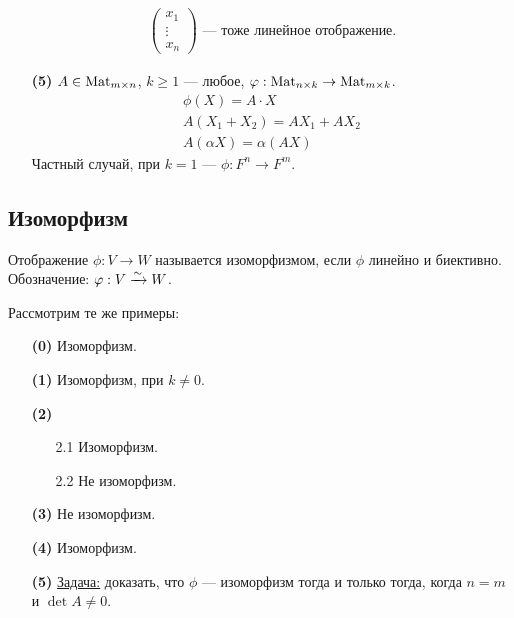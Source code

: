 \begin{itemize}
\begin{gather*}
\begin{pmatrix*}
x_1 \\
\vdots \\
x_n
\end{pmatrix*} \text{ --- тоже линейное отображение.}
\end{gather*}
\item[\textbf{(5)}] $A \in \mathrm{Mat}_{m\times n}$, $k \geqslant 1$ --- любое, $\varphi: \mathrm{Mat}_{n\times k} \rightarrow \mathrm{Mat}_{m\times k}$.
\begin{gather*}
\phi(X) = A \cdot X \\
A(X_1 + X_2) = AX_1 + AX_2 \\
A(\alpha X) = \alpha(AX) 
\end{gather*}
Частный случай, при $k = 1$ --- $\phi: F^n \rightarrow F^m$.
\end{itemize}

\subsection{Изоморфизм}
\begin{Def}
Отображение $\phi: V \rightarrow W$ называется изоморфизмом, если $\phi$ линейно и биективно. Обозначение: $\varphi : V \xrightarrow{\sim}  W$.
\end{Def}
\vspace{0.3cm}
Рассмотрим те же примеры:
\begin{itemize}
\item[\textbf{(0)}] Изоморфизм.
\item[\textbf{(1)}] Изоморфизм, при $k \neq 0$.
\item[\textbf{(2)}]
\begin{itemize}
\item[2.1] Изоморфизм.
\item[2.2] Не изоморфизм.
\end{itemize}
\item[\textbf{(3)}] Не изоморфизм.
\item[\textbf{(4)}] Изоморфизм.
\item[\textbf{(5)}] \underline{Задача:} доказать, что $\phi$ --- изоморфизм тогда и только тогда, когда $n = m$ и $\det A \neq 0$.
\end{itemize}

